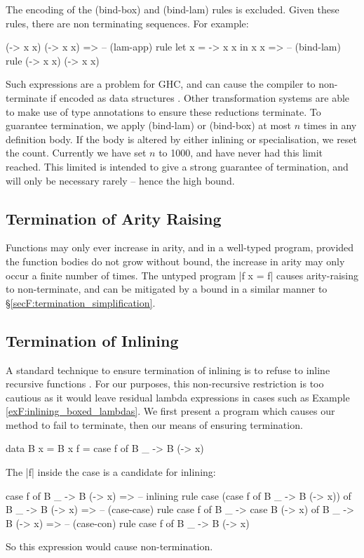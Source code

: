 The encoding of the (bind-box) and (bind-lam) rules is excluded. Given these rules, there are non terminating sequences. For example:

\ignore\begin{code}
(\x -> x x) (\x -> x x)
   => -- (lam-app) rule
let x = \x -> x x in x x
   => -- (bind-lam) rule
(\x -> x x) (\x -> x x)
\end{code}

Such expressions are a problem for GHC, and can cause the compiler to non-terminate if encoded as data structures \cite{spj:inlining}. Other transformation systems \cite{chin:higher_order_removal} are able to make use of type annotations to ensure these reductions terminate. To guarantee termination, we apply (bind-lam) or (bind-box) at most $n$ times in any definition body. If the body is altered by either inlining or specialisation, we reset the count. Currently we have set $n$ to 1000, and have never had this limit reached. This limited is intended to give a strong guarantee of termination, and will only be necessary rarely -- hence the high bound.

\subsection{Termination of Arity Raising}

Functions may only ever increase in arity, and in a well-typed program, provided the function bodies do not grow without bound, the increase in arity may only occur a finite number of times. The untyped program |f x = f| causes arity-raising to non-terminate, and can be mitigated by a bound in a similar manner to \S\ref{secF:termination_simplification}.

\subsection{Termination of Inlining}

A standard technique to ensure termination of inlining is to refuse to inline recursive functions \cite{spj:inlining}. For our purposes, this non-recursive restriction is too cautious as it would leave residual lambda expressions in cases such as Example \ref{exF:inlining_boxed_lambdas}. We first present a program which causes our method to fail to terminate, then our means of ensuring termination.

\begin{example}
\begin{code}
data B x = B x
f = case  f of
          B _ -> B (\x -> x)
\end{code}

The |f| inside the case is a candidate for inlining:

\ignore\begin{code}
case f of B _ -> B (\x -> x)
    => -- inlining rule
case (case f of B _ -> B (\x -> x)) of B _ -> B (\x -> x)
    => -- (case-case) rule
case f of B _ -> case B (\x -> x) of B _ -> B (\x -> x)
    => -- (case-con) rule
case f of B _ -> B (\x -> x)
\end{code}

\noindent So this expression would cause non-termination.
\end{example}


